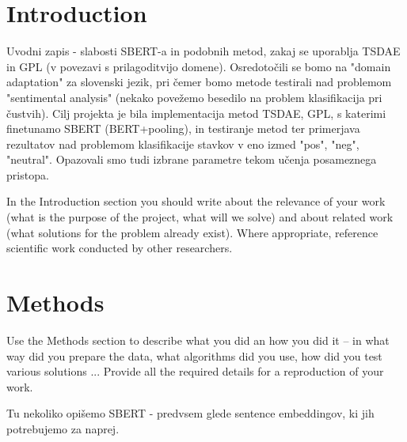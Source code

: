 \documentclass[fleqn,moreauthors,10pt]{ds_report}
\affiliation{\textit{Advisors: Slavko Žitnik, Aleš Žagar, Boshko Koloski}}
\begin{document}
\flushbottom 

\maketitle 

\thispagestyle{empty} 


\section*{Introduction}
	Uvodni zapis - slabosti SBERT-a in podobnih metod, zakaj se uporablja TSDAE in GPL (v povezavi s prilagoditvijo domene). Osredotočili se bomo na "domain adaptation" za slovenski jezik, pri čemer bomo metode testirali nad problemom "sentimental analysis" (nekako povežemo besedilo na problem klasifikacija pri čustvih). Cilj projekta je bila implementacija metod TSDAE, GPL, s katerimi finetunamo SBERT (BERT+pooling), in testiranje metod ter primerjava rezultatov nad problemom klasifikacije stavkov v eno izmed "pos", "neg", "neutral". Opazovali smo tudi izbrane parametre tekom učenja posameznega pristopa.

	In the Introduction section you should write about the
	relevance of your work (what is the purpose of the project,
	what will we solve) and about related work (what solutions
	for the problem already exist). Where appropriate, reference
	scientific work conducted by other researchers.




\section*{Methods}


Use the Methods section to describe what you did an how you did it -- in what way did you prepare the data, what algorithms did you use, how did you test various solutions ... Provide all the required details for a reproduction of your work.

Tu nekoliko opišemo SBERT - predvsem glede sentence embeddingov, ki jih potrebujemo za naprej.
\end{document}
